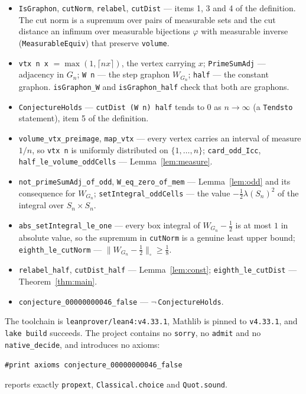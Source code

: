\documentclass[11pt]{article}
\theoremstyle{plain}
\theoremstyle{definition}
\theoremstyle{remark}
\newcommand{\cut}{\square}
\begin{document}
\begin{itemize}
  \item \texttt{IsGraphon}, \texttt{cutNorm}, \texttt{relabel},
    \texttt{cutDist} --- items 1, 3 and 4 of the definition. The cut norm is a
    supremum over pairs of measurable sets and the cut distance an infimum over
    measurable bijections $\varphi$ with measurable inverse
    (\texttt{MeasurableEquiv}) that preserve \texttt{volume}.
  \item \texttt{vtx n x} $=\max(1,\lceil nx\rceil)$, the vertex carrying $x$;
    \texttt{PrimeSumAdj} --- adjacency in $G_n$; \texttt{W n} --- the step
    graphon $W_{G_n}$; \texttt{half} --- the constant graphon.
    \texttt{isGraphon\_W} and \texttt{isGraphon\_half} check that both are
    graphons.
  \item \texttt{ConjectureHolds} --- \texttt{cutDist (W n) half} tends to $0$
    as $n\to\infty$ (a \texttt{Tendsto} statement), item 5 of the definition.
  \item \texttt{volume\_vtx\_preimage}, \texttt{map\_vtx} --- every vertex
    carries an interval of measure $1/n$, so \texttt{vtx n} is uniformly
    distributed on $\{1,\ldots,n\}$; \texttt{card\_odd\_Icc},
    \texttt{half\_le\_volume\_oddCells} --- Lemma~\ref{lem:measure}.
  \item \texttt{not\_primeSumAdj\_of\_odd}, \texttt{W\_eq\_zero\_of\_mem} ---
    Lemma~\ref{lem:odd} and its consequence for $W_{G_n}$;
    \texttt{setIntegral\_oddCells} --- the value $-\frac12\lambda(S_n)^2$ of the
    integral over $S_n\times S_n$.
  \item \texttt{abs\_setIntegral\_le\_one} --- every box integral of
    $W_{G_n}-\frac12$ is at most $1$ in absolute value, so the supremum in
    \texttt{cutNorm} is a genuine least upper bound; \texttt{eighth\_le\_cutNorm}
    --- $\|W_{G_n}-\frac12\|_\cut\ge\frac18$.
  \item \texttt{relabel\_half}, \texttt{cutDist\_half} ---
    Lemma~\ref{lem:const}; \texttt{eighth\_le\_cutDist} ---
    Theorem~\ref{thm:main}.
  \item \texttt{conjecture\_00000000046\_false} ---
    $\lnot\,$\texttt{ConjectureHolds}.
\end{itemize}

The toolchain is \texttt{leanprover/lean4:v4.33.1}, Mathlib is pinned to
\texttt{v4.33.1}, and \texttt{lake build} succeeds. The project contains no
\texttt{sorry}, no \texttt{admit} and no \texttt{native\_decide}, and
introduces no axioms:
\begin{center}
\texttt{\#print axioms conjecture\_00000000046\_false}
\end{center}
reports exactly \texttt{propext}, \texttt{Classical.choice} and
\texttt{Quot.sound}.
\end{document}
